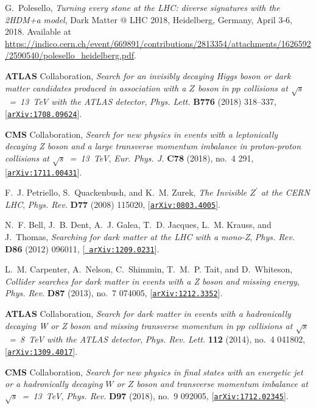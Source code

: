 \documentclass[review]{elsarticle}
\begin{document}
\begin{thebibliography}{100}
G.~Polesello, {\it {Turning every stone at the LHC: diverse signatures with the
  2HDM+a model}},  {Dark Matter @ LHC 2018, Heidelberg, Germany,
  April 3-6, 2018}.
\newblock Available at
  \url{https://indico.cern.ch/event/669891/contributions/2813354/attachments/1626592/2590540/polesello_heidelberg.pdf}.

{\bf ATLAS} Collaboration, {\it {Search for an invisibly
  decaying Higgs boson or dark matter candidates produced in association with a
  $Z$ boson in $pp$ collisions at $\sqrt{s}$~=~13~TeV with the ATLAS
  detector}},  {\em Phys. Lett.} {\bf B776} (2018) 318--337,
  [\href{http://arxiv.org/abs/1708.09624}{{\tt arXiv:1708.09624}}].

{\bf CMS} Collaboration, {\it {Search for new physics in
  events with a leptonically decaying Z boson and a large transverse momentum
  imbalance in proton-proton collisions at $\sqrt{s}$~=~13~TeV}},
  {\em Eur. Phys. J.} {\bf C78} (2018), no.~4 291,
  [\href{http://arxiv.org/abs/1711.00431}{{\tt arXiv:1711.00431}}].

F.~J. Petriello, S.~Quackenbush, and K.~M. Zurek, {\it {The Invisible
  $Z^\prime$ at the CERN LHC}},  {\em Phys. Rev.} {\bf D77} (2008) 115020,
  [\href{http://arxiv.org/abs/0803.4005}{{\tt arXiv:0803.4005}}].

N.~F. Bell, J.~B. Dent, A.~J. Galea, T.~D. Jacques, L.~M. Krauss, and J.~Thomas, 
{\it Searching for dark matter at the {LHC} with a mono-{Z}},  {\em Phys. Rev.}
  {\bf D86} (2012) 096011, [\href{http://arxiv.org/abs/1209.0231}{{\tt
  arXiv:1209.0231}}].
  
L.~M. Carpenter, A.~Nelson, C.~Shimmin, T.~M.~P. Tait, and D.~Whiteson, {\it
  {Collider searches for dark matter in events with a Z boson and missing
  energy}},  {\em Phys. Rev.} {\bf D87} (2013), no.~7 074005,
  [\href{http://arxiv.org/abs/1212.3352}{{\tt arXiv:1212.3352}}].

{\bf ATLAS} Collaboration, {\it {Search for dark matter in
  events with a hadronically decaying W or Z boson and missing transverse
  momentum in $pp$ collisions at $\sqrt{s}$~=~8~TeV with the ATLAS detector}},
  {\em Phys. Rev. Lett.} {\bf 112} (2014), no.~4 041802,
  [\href{http://arxiv.org/abs/1309.4017}{{\tt arXiv:1309.4017}}].

{\bf CMS} Collaboration, {\it {Search for new physics in
  final states with an energetic jet or a hadronically decaying $W$ or $Z$
  boson and transverse momentum imbalance at $\sqrt{s}$~=~13~TeV}},  {\em Phys. Rev.} {\bf D97} (2018), no.~9 092005,
  [\href{http://arxiv.org/abs/1712.02345}{{\tt arXiv:1712.02345}}].


\end{thebibliography}
\end{document}
